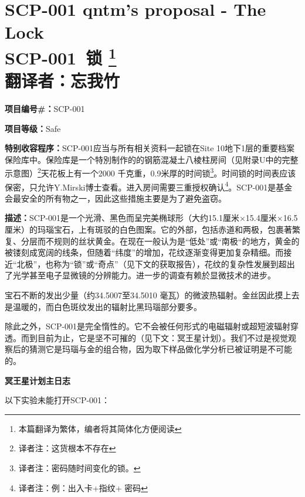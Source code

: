 \documentclass[openany,a4paper]{book} %
\newcounter{mychapter} %
\begin{document}
\addtocounter{mychapter}{1}
\chapter[SCP-001 锁]{SCP-001 qntm's proposal - The Lock \\ SCP-001~锁 \protect\footnote{本篇翻译为繁体，编者将其简体化方便阅读} \\ 翻译者：忘我竹}\label{chap:SCP-001-4}

\textbf{项目编号\#：}SCP-001\vspace{12pt}

\textbf{项目等级：}Safe\vspace{12pt}

\textbf{特别收容程序：}SCP-001应当与所有相关资料一起锁在Site 10地下1层的重要档案保险库中。保险库是一个特別制作的的钢筋混凝土八棱柱房间（见附录U中的完整示意图）\footnote{译者注：这货根本不存在}天花板上有一个2000 千克重，0.9米厚的时间锁\footnote{译者注：密码随时间变化的锁。}。时间锁的时间表应该保密，只允许Y.Mirski博士查看。进入房间需要三重授权确认\footnote{译者注：例：出入卡+指纹+ 密码}。SCP-001是基金会最安全的所有物之一，因此这些措施主要是为了避免盗窃。\vspace{12pt}

\textbf{描述：}SCP-001是一个光滑、黑色而呈完美椭球形（大约15.1厘米×15.4厘米×16.5 厘米）的玛瑙宝石，上有斑驳的白色图案。它的外部，包括赤道和两极，包裹著繁复、分层而不规则的丝状黄金。在现在一般认为是“低处”或“南极“的地方，黄金的被镂刻成宽阔的线条，但随着“纬度”的增加，花纹逐渐变得更加复杂精细。而接近“北极”，也称为“锁”或“奇点”（见下文的获取报告），花纹的复杂性发展到超出了光学甚至电子显微镜的分辨能力。进一步的调查有赖於显微技术的进步。\vspace{12pt}

宝石不断的发出少量（约34.5007至34.5010 毫瓦）的微波热辐射。金丝因此摸上去是温暖的，而白色斑纹发出的辐射比黑玛瑙部分要多。\vspace{12pt}

除此之外，SCP-001是完全惰性的。它不会被任何形式的电磁辐射或超短波辐射穿透。而到目前为止，它是坚不可摧的（见下文：冥王星计划）。我们不过是视觉观察后的猜测它是玛瑙与金的组合物，因为取下样品做化学分析已被证明是不可能的。\vspace{12pt}

\textbf{冥王星计划主日志}\vspace{12pt}

以下实验未能打开SCP-001：
\end{document}
